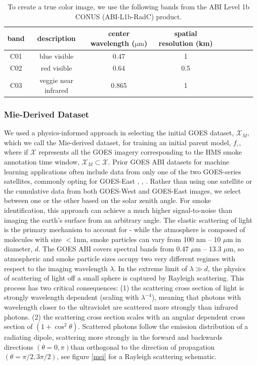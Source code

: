 \documentclass{article}
\begin{document}
\begin{table}
    \caption{To create a true color image, we use the following bands from the ABI Level 1b CONUS (ABI-L1b-RadC) product.}\label{rgb_bands}
    \centering
        \begin{tabular}{ccccrrcrc}
            \toprule
            band & description & center wavelength ($\mathrm{\mu m}$) & spatial resolution (km)\\
            \midrule
            C01 &  blue visible & 0.47 & 1 \\
            C02 & red visible & 0.64 & 0.5 \\
            C03 & veggie near infrared & 0.865 & 1 \\
            \bottomrule
        \end{tabular}
\end{table}


\subsubsection*{Mie-Derived Dataset}

We used a physics-informed approach in selecting the initial GOES dataset, \(\mathcal{X}_M\), which we call the Mie-derived dataset, for training an initial parent model, \(f_{\circ}\), where if \(\mathcal{X}\) represents all the GOES imagery corresponding to the HMS smoke annotation time window, \(\mathcal{X}_M \subset \mathcal{X}\). Prior GOES ABI datasets for machine learning applications often include data from only one of the two GOES-series satellites, commonly opting for GOES-East \cite{smoke_goes}, \cite{wildfire_detect}, \cite{goes_conv}. Rather than using one satellite or the cumulative data from both GOES-West and GOES-East images, we select between one or the other based on the solar zenith angle. For smoke identification, this approach can achieve a much higher signal-to-noise than imaging the earth’s surface from an arbitrary angle. The elastic scattering of light is the primary mechanism to account for - while the atmosphere is composed of molecules with size \(<\)1nm, smoke particles can vary from 100 nm -- 10 \(\mu\)m in diameter, \(d\). The GOES ABI covers spectral bands from 0.47 \(\mu\)m -- 13.3 \(\mu\)m, so atmospheric and smoke particle sizes occupy two very different regimes with respect to the imaging wavelength \(\lambda\). In the extreme limit of \(\lambda \gg d\), the physics of scattering of light off a small sphere is captured by Rayleigh scattering. This process has two critical consequences: (1) the scattering cross section of light is strongly wavelength dependent (scaling with \(\lambda^{-4}\)), meaning that photons with wavelength closer to the ultraviolet are scattered more strongly than infrared photons. (2) the scattering cross section scales with an angular dependent cross section of \((1 + \cos^2 \theta)\). Scattered photons follow the emission distribution of a radiating dipole, scattering more strongly in the forward and backwards directions \((\theta = 0,\pi)\)than orthogonal to the direction of propagation \((\theta = \pi/2, 3\pi/2)\), see figure \ref{mei} for a Rayleigh scattering schematic.
\end{document}
